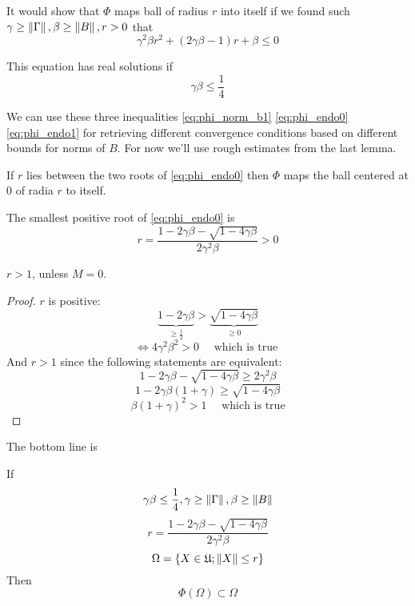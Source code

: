 \documentclass{article}
\begin{document}
    It would show that \( \Phi \) maps ball of radius \( r \) into itself
    if we found such \( \gamma\geq\left\|{\Gamma}\right\|, \beta\geq\left\|{B}\right\|, r>0 \)
    that
\begin{equation}\label{eq:phi_endo0}
    \gamma^2\beta r^2 + (2\gamma\beta - 1) r + \beta \leq 0
\end{equation}

This equation has real solutions if
\begin{equation}\label{eq:phi_endo1}
    \gamma\beta\leq\frac14
\end{equation}

We can use these three inequalities \eqref{eq:phi_norm_b1} \eqref{eq:phi_endo0} \eqref{eq:phi_endo1}
for retrieving different convergence conditions based on different bounds for norms of \( B \).
For now we'll use rough estimates from the last lemma.

\begin{lemma}
    If \( r \) lies between the two roots of \eqref{eq:phi_endo0}
    then \( \Phi \) maps the ball centered at \( 0 \) of radia \( r \) to itself.

    The smallest positive root of \eqref{eq:phi_endo0} is
    \begin{equation}\label{eq:endo_r0}
        r = \frac{1 - 2\gamma\beta - \sqrt{1-4\gamma\beta}}{2 \gamma^2 \beta} > 0
    \end{equation}

    \( r>1 \), unless \( M=0 \).
\end{lemma}
\begin{proof}
    \( r \) is positive:
    \[\underbrace{1-2\gamma\beta}_{\geq\frac12} > \underbrace{\sqrt{1-4\gamma\beta}}_{\geq0}\]
    \[\iff 4\gamma^2\beta^2 > 0 \quad\text{ which is true }\]
    And \( r>1 \) since the following statements are equivalent:
    \[1 - 2\gamma\beta - \sqrt{1-4\gamma\beta} \geq 2 \gamma^2 \beta\]
    \[1 - 2\gamma\beta(1 +  \gamma) \geq \sqrt{1-4\gamma\beta}\]
    \[\beta(1+\gamma)^2>1 \quad\text{ which is true}\]
\end{proof}

The bottom line is
\begin{lemma}\label{thm:endo}
    If
    \[\gamma\beta\leq\frac14, \gamma\geq\left\|{\Gamma}\right\|, \beta\geq\left\|{B}\right\|\]
    \[r = \frac{1 - 2\gamma\beta - \sqrt{1-4\gamma\beta}}{2 \gamma^2 \beta}\]
    \[\Omega = \{ X\in\mathfrak U; \left\|{X}\right\| \leq r \}\]
    Then
    \[\Phi(\Omega)\subset\Omega\]
\end{lemma}
\end{document}
